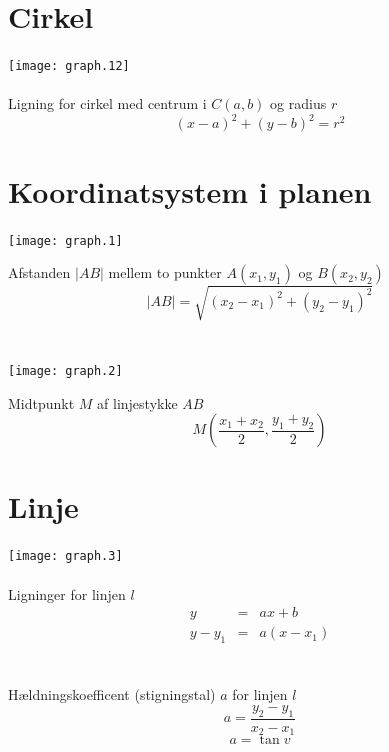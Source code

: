 \documentclass[11pt,a5paper,fleqn,leqno]{book}
\begin{document}
\section{Cirkel}

\texttt{[image: graph.12]}
\\
\\
Ligning for cirkel med centrum i $C(a,b)$ og radius $r$
\begin{equation}
(x-a)^2 + (y-b)^2 = r^2
\end{equation}

\newpage

\section{Koordinatsystem i planen}

\texttt{[image: graph.1]}

Afstanden $|AB|$ mellem to punkter $A(x_1,y_1)$ og $B(x_2,y_2)$
\begin{equation}
|AB| = \sqrt{(x_2-x_1)^2 + (y_2-y_1)^2}
\end{equation}
\\
\\
\texttt{[image: graph.2]}

Midtpunkt $M$ af linjestykke $AB$
\begin{equation}
M\left(\frac{x_1+x_2}{2},\frac{y_1+y_2}{2}\right)
\end{equation}

\vfill

\section{Linje}

\texttt{[image: graph.3]}
\\
\\
Ligninger for linjen $l$
\begin{eqnarray}
y     & = & ax+b \\
y-y_1 & = & a(x-x_1) \nonumber
\end{eqnarray}
\\
\\
Hældningskoefficent (stigningstal) $a$ for linjen $l$
\begin{equation}
a = \frac{y_2 - y_1}{x_2 - x_1}
\end{equation}
\begin{equation}
a = \tan v
\end{equation}

\newpage
\end{document}
